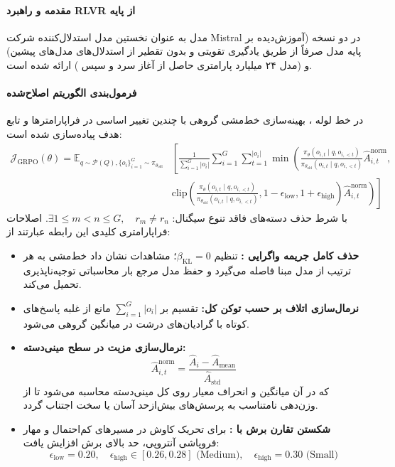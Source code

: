 \item {}

\paragraph*{مقدمه و راهبرد RLVR از پایه}
مدل  \cite{mistral2025magistral} به عنوان نخستین مدل استدلال‌کننده شرکت Mistral در دو نسخه  (آموزش‌دیده بر پایه مدل  صرفاً از طریق یادگیری تقویتی و بدون تقطیر از استدلال‌های مدل‌های پیشین) و  (مدل ۲۴ میلیارد پارامتری حاصل از آغاز سرد  و سپس ) ارائه شده است.

\paragraph*{فرمول‌بندی الگوریتم  اصلاح‌شده}
در خط لوله ، بهینه‌سازی خط‌مشی گروهی با چندین تغییر اساسی در فراپارامترها و تابع هدف پیاده‌سازی شده است:
\begin{align*}
    \mathcal{J}_{\text{GRPO}}(\theta) = \mathbb{E}_{q \sim \mathcal{P}(Q), \{o_i\}_{i=1}^G \sim \pi_{\theta_{\text{old}}}} & \left[ \frac{1}{\sum_{i=1}^G |o_i|} \sum_{i=1}^G \sum_{t=1}^{|o_i|} \min \left( \frac{\pi_\theta(o_{i,t} \mid q, o_{i,<t})}{\pi_{\theta_{\text{old}}}(o_{i,t} \mid q, o_{i,<t})} \hat{A}_{i,t}^{\text{norm}}, \right. \right. \\
    & \left. \left. \text{clip}\left( \frac{\pi_\theta(o_{i,t} \mid q, o_{i,<t})}{\pi_{\theta_{\text{old}}}(o_{i,t} \mid q, o_{i,<t})}, 1-\epsilon_{\text{low}}, 1+\epsilon_{\text{high}} \right) \hat{A}_{i,t}^{\text{norm}} \right) \right]
\end{align*}
با شرط حذف دسته‌های فاقد تنوع سیگنال: $\exists 1 \le m < n \le G, \quad r_m \neq r_n$.
اصلاحات فراپارامتری کلیدی این رابطه عبارتند از:
\begin{itemize}
    \item \textbf{حذف کامل جریمه واگرایی :} تنظیم $\beta_{\text{KL}} = 0$؛ مشاهدات نشان داد خط‌مشی به هر ترتیب از مدل مبنا فاصله می‌گیرد و حفظ مدل مرجع بار محاسباتی توجیه‌ناپذیری تحمیل می‌کند.
    \item \textbf{نرمال‌سازی اتلاف بر حسب توکن کل:} تقسیم بر $\sum_{i=1}^G |o_i|$ مانع از غلبه پاسخ‌های کوتاه با گرادیان‌های درشت در میانگین گروهی می‌شود.
    \item \textbf{نرمال‌سازی مزیت در سطح مینی‌دسته:}
    \begin{equation}
        \hat{A}_{i,t}^{\text{norm}} = \frac{\hat{A}_i - \hat{A}_{\text{mean}}}{\hat{A}_{\text{std}}}
    \end{equation}
    که در آن میانگین و انحراف معیار روی کل مینی‌دسته محاسبه می‌شود تا از وزن‌دهی نامتناسب به پرسش‌های بیش‌ازحد آسان یا سخت اجتناب گردد.
    \item \textbf{شکستن تقارن برش با :} برای تحریک کاوش در مسیرهای کم‌احتمال و مهار فروپاشی آنتروپی، حد بالای برش افزایش یافت:
    \begin{equation}
        \epsilon_{\text{low}} = 0.20, \quad \epsilon_{\text{high}} \in [0.26, 0.28] \text{ (Medium)}, \quad \epsilon_{\text{high}} = 0.30 \text{ (Small)}
    \end{equation}
\end{itemize}

